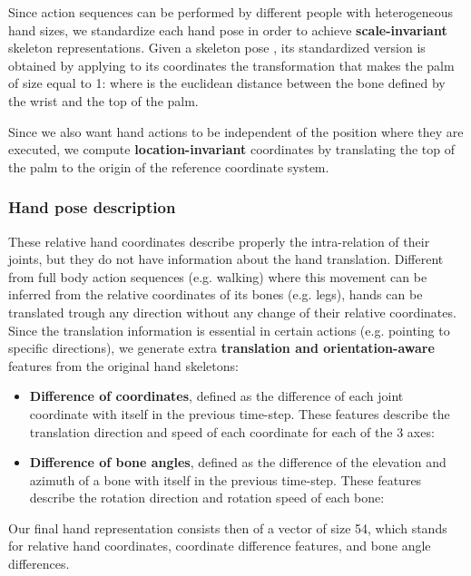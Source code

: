 \documentclass[letterpaper, 10 pt, conference]{ieeeconf}
\begin{document}
Since action sequences can be performed by different people with heterogeneous hand sizes, we standardize each hand pose in order to achieve \textbf{scale-invariant} skeleton representations. Given a skeleton pose , its standardized version  is obtained by applying to its coordinates the transformation that makes the palm of size equal to 1:  where  is the euclidean distance between the bone defined by the wrist and the top of the palm.

Since we also want hand actions to be independent of the position where they are executed, we compute \textbf{location-invariant} coordinates by translating the top of the palm to the origin of the reference coordinate system. 




\subsubsection{Hand pose description}

These relative hand coordinates describe properly 
the intra-relation of their joints, but they do not have information about the hand translation.
Different from full body action sequences (e.g. walking) where this movement
can be inferred from the relative coordinates of its bones (e.g. legs),
hands can be translated trough any direction without any change of their relative coordinates. Since the translation information is essential in certain actions (e.g. pointing to specific directions), we generate extra \textbf{translation and orientation-aware} features from the original hand skeletons:
\begin{itemize}
    \item \textbf{Difference of coordinates}, defined as the difference of each joint coordinate with itself in the previous time-step. These features describe the translation direction and speed of each coordinate for each of the 3 axes:
        
    \item \textbf{Difference of bone angles}, defined as the difference of the elevation  and azimuth  of a bone  with itself in the previous time-step. These features describe the rotation direction and rotation speed of each bone:
        
        
\end{itemize}

Our final hand representation consists then of a vector of size 54, which stands for  relative hand coordinates,  coordinate difference features, and  bone angle differences.
\end{document}
